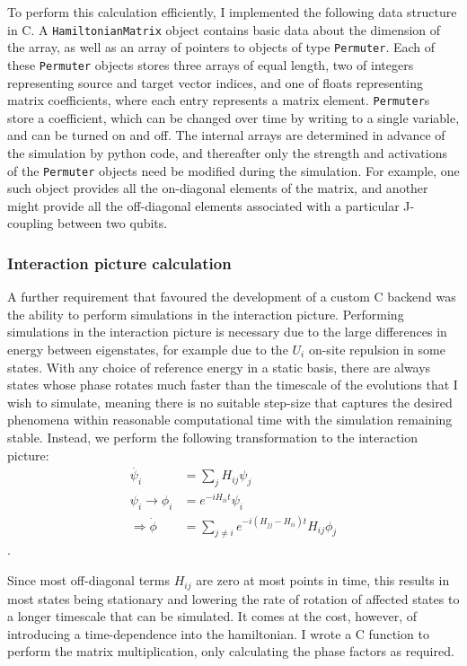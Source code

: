 \documentclass{report}
\begin{document}
To perform this calculation efficiently, I implemented the following data structure in C. A \texttt{HamiltonianMatrix} object contains basic data about the dimension of the array, as well as an array of pointers to objects of type \texttt{Permuter}. Each of these \texttt{Permuter} objects stores three arrays of equal length, two of integers representing source and target vector indices, and one of floats representing matrix coefficients, where each entry represents a matrix element. \texttt{Permuter}s store a coefficient, which can be changed over time by writing to a single variable, and can be turned on and off. The internal arrays are determined in advance of the simulation by python code, and thereafter only the strength and activations of the \texttt{Permuter} objects need be modified during the simulation. For example, one such object provides all the on-diagonal elements of the matrix, and another might provide all the off-diagonal elements associated with a particular J-coupling between two qubits.
\subsubsection{Interaction picture calculation}
A further requirement that favoured the development of a custom C backend was the ability to perform simulations in the interaction picture. Performing simulations in the interaction picture is necessary due to the large differences in energy between eigenstates, for example due to the $U_i$ on-site repulsion in some states. With any choice of reference energy in a static basis, there are always states whose phase rotates much faster than the timescale of the evolutions that I wish to simulate, meaning there is no suitable step-size that captures the desired phenomena within reasonable computational time with the simulation remaining stable. Instead, we perform the following transformation to the interaction picture:
\begin{align*}
    \dot{\psi_i} &= \sum_j{H_{ij}\psi_j}\\
     \psi_i \rightarrow \phi_i &= e^{-i H_{ii} t} \psi_i \\
    \Rightarrow \dot{\phi} &= \sum_{j\ne i}{e^{- i (H_{jj} - H_{ii})t} H_{ij}\phi_j}
\end{align*}.

Since most off-diagonal terms $H_{ij}$ are zero at most points in time, this results in most states being stationary and lowering the rate of rotation of affected states to a longer timescale that can be simulated. It comes at the cost, however, of introducing a time-dependence into the hamiltonian. I wrote a C function to perform the matrix multiplication, only calculating the phase factors as required.
\end{document}
